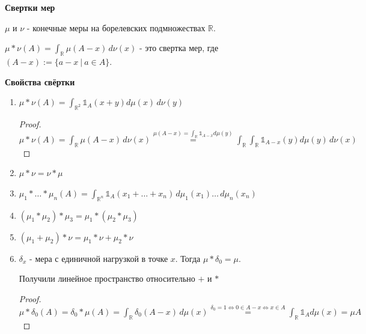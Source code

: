 \begin{remark}
    \textbf{Свертки мер}

    $\mu$ и $\nu$ - конечные меры на борелевских подмножествах $\mathbb{R}$.

    $\mu * \nu (A) = \int_{\mathbb{R}} \mu (A - x) \, d\nu (x)$ - это свертка мер, где $(A - x) := \{ a - x \ | \ a \in A \}$.

    \begin{properties}
        \textbf{Свойства свёртки}

        \begin{enumerate}
            \item {
                $\mu * \nu (A) = \int_{\mathbb{R}^2} \mathds{1}_A (x + y) d\mu (x) \, d\nu (y)$

                \begin{proof}
                    $\mu * \nu (A) = \int_{\mathbb{R}} \mu (A - x) \, d\nu (x) \overset{\mu (A - x) = \int_{\mathbb{R}} \mathds{1}_{A - x} d\mu (y) }{=}
                    \int_{\mathbb{R}} \int_{\mathbb{R}} \mathds{1}_{A - x} (y) d\mu (y) \, d\nu (x)$
                \end{proof}
            }
            \item {
                $\mu * \nu = \nu * \mu$
            }
            \item {
                $\mu_1 * \ldots * \mu_n (A) = \int_{\mathbb{R}^n} \mathds{1}_A (x_1 + \ldots + x_n) \, d\mu_1 (x_1) \ldots \, d \mu_n (x_n)$
            }
            \item {
                $(\mu_1 * \mu_2) * \mu_3 = \mu_1 * (\mu_2 * \mu_3)$
            }
            \item {
                $(\mu_1 + \mu_2) * \nu = \mu_1 * \nu + \mu_2 * \nu$
            }
            \item {
                $\delta_x$ - мера с единичной нагрузкой в точке $x$. Тогда $\mu * \delta_0 = \mu$.

                Получили линейное пространство относительно $+$ и $*$

                \begin{proof}
                    $\mu * \delta_0 (A) = \delta_0 * \mu (A) = \int_{\mathbb{R}} \delta_0 (A - x) \, d\mu (x) 
                    \overset{\delta_0 = 1 \Leftrightarrow 0 \in A - x \Leftrightarrow x \in A}{=} \int_{\mathbb{R}} \mathds{1}_{A} d\mu (x) = \mu A$
                \end{proof}
            }
        \end{enumerate}
    \end{properties}
\end{remark}


